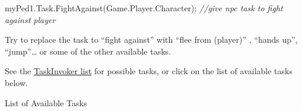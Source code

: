 \documentclass[
  openany]{book}
\newenvironment{Shaded}{\begin{snugshade}}{\end{snugshade}}
\newcommand{\CommentTok}[1]{\textcolor[rgb]{0.56,0.35,0.01}{\textit{#1}}}
\newcommand{\FunctionTok}[1]{\textcolor[rgb]{0.00,0.00,0.00}{#1}}
\newcommand{\NormalTok}[1]{#1}
\begin{document}
\begin{Shaded}
\begin{Highlighting}[]
\NormalTok{myPed1.}\FunctionTok{Task}\NormalTok{.}\FunctionTok{FightAgainst}\NormalTok{(Game.}\FunctionTok{Player}\NormalTok{.}\FunctionTok{Character}\NormalTok{); }\CommentTok{//give npc task to fight against player}
\end{Highlighting}
\end{Shaded}

Try to replace the task to ``fight against'' with ``flee from (player)'' , ``hands up'', ``jump''\ldots{} or some of the other available tasks.

See the \href{https://nitanmarcel.github.io/shvdn-docs.github.io/class_g_t_a_1_1_task_invoker.html}{TaskInvoker list} for possible tasks, or click on the list of available tasks below.

List of Available Tasks
\end{document}
